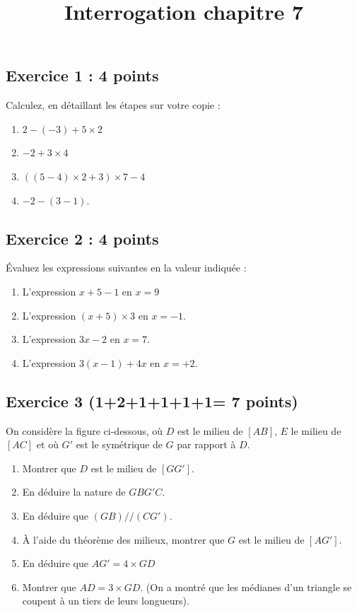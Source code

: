\documentclass[14pt]{extreport}
\title{Interrogation chapitre 7}
\date{}
\theoremstyle{plain}
\begin{document}
 \subsection*{Exercice 1 : 4 points}
Calculez, en détaillant les étapes sur votre copie : 

\begin{enumerate}
\item $2 - (-3) + 5 \times  2$
\item $ -2 + 3 \times 4$
\item $((5 - 4) \times 2 + 3 )\times 7 - 4$
\item $-2 - (3 - 1)$.
\end{enumerate}

\subsection*{Exercice 2 : 4 points}
Évaluez les expressions suivantes en la valeur indiquée : 
\begin{enumerate}
\item L'expression $x+5 - 1 $ en $x=9$
\item L'expression $(x+5)\times 3$ en $x=-1$.
\item L'expression $3x-2$ en $x=7$.
\item L'expression $3(x-1)+4x$ en $x=+2$.
\end{enumerate}

\subsection*{Exercice 3 (1+2+1+1+1+1= 7 points)}

On considère la figure ci-dessous, où $D$ est le milieu de $[AB]$, $E$ le milieu de $[AC]$ et où $G'$ est le symétrique de $G$ par rapport à $D$.
\begin{enumerate}
\item Montrer que $D$ est le milieu de $[GG']$. 
\item En déduire la nature de $GBG'C$. 
\item En déduire que $(GB)//(CG')$. 
\item À l'aide du théorème des milieux, montrer que $G$ est le milieu de $[AG']$. 
\item En déduire que $AG'= 4\times GD$
\item Montrer que $AD= 3\times GD$. (On a montré que les médianes d'un triangle se coupent à un tiers de leurs longueurs).
\end{enumerate}
\end{document}
